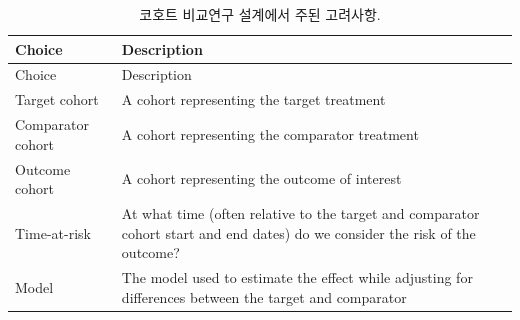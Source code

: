 \documentclass[10.5pt]{book}
\theoremstyle{definition}
\theoremstyle{definition}
\theoremstyle{definition}
\theoremstyle{remark}
\begin{document}
\begin{longtable}[]{@{}ll@{}}
\caption{\label{tab:cmChoices} 코호트 비교연구 설계에서 주된
고려사항.}\tabularnewline
\toprule
\begin{minipage}[b]{0.23\columnwidth}\raggedright\strut
Choice\strut
\end{minipage} & \begin{minipage}[b]{0.71\columnwidth}\raggedright\strut
Description\strut
\end{minipage}\tabularnewline
\midrule
\endfirsthead
\toprule
\begin{minipage}[b]{0.23\columnwidth}\raggedright\strut
Choice\strut
\end{minipage} & \begin{minipage}[b]{0.71\columnwidth}\raggedright\strut
Description\strut
\end{minipage}\tabularnewline
\midrule
\endhead
\begin{minipage}[t]{0.23\columnwidth}\raggedright\strut
Target cohort\strut
\end{minipage} & \begin{minipage}[t]{0.71\columnwidth}\raggedright\strut
A cohort representing the target treatment\strut
\end{minipage}\tabularnewline
\begin{minipage}[t]{0.23\columnwidth}\raggedright\strut
Comparator cohort\strut
\end{minipage} & \begin{minipage}[t]{0.71\columnwidth}\raggedright\strut
A cohort representing the comparator treatment\strut
\end{minipage}\tabularnewline
\begin{minipage}[t]{0.23\columnwidth}\raggedright\strut
Outcome cohort\strut
\end{minipage} & \begin{minipage}[t]{0.71\columnwidth}\raggedright\strut
A cohort representing the outcome of interest\strut
\end{minipage}\tabularnewline
\begin{minipage}[t]{0.23\columnwidth}\raggedright\strut
Time-at-risk\strut
\end{minipage} & \begin{minipage}[t]{0.71\columnwidth}\raggedright\strut
At what time (often relative to the target and comparator cohort start
and end dates) do we consider the risk of the outcome?\strut
\end{minipage}\tabularnewline
\begin{minipage}[t]{0.23\columnwidth}\raggedright\strut
Model\strut
\end{minipage} & \begin{minipage}[t]{0.71\columnwidth}\raggedright\strut
The model used to estimate the effect while adjusting for differences
between the target and comparator\strut
\end{minipage}\tabularnewline
\bottomrule
\end{longtable}
\end{document}
